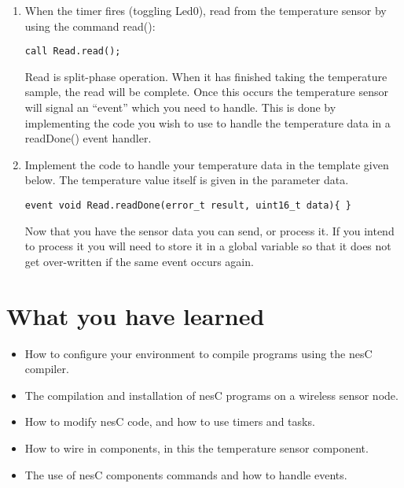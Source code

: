 \documentclass [a4] {article}
\begin{document}
\begin{enumerate}

\item When the timer fires (toggling Led0), read from the temperature sensor by using the command read():

\begin{verbatim}
call Read.read();
\end{verbatim}

Read is split-phase operation. When it has finished taking the temperature sample, the read will be complete. Once this occurs the temperature sensor will signal an ``event'' which you need to handle. This is done by implementing the code you wish to use to handle the temperature data in a readDone() event handler.

\item Implement the code to handle your temperature data in the template given below. The temperature value itself is given in the parameter data.

\begin{verbatim}
event void Read.readDone(error_t result, uint16_t data){ }
\end{verbatim}

Now that you have the sensor data you can send, or process it. If you intend to process it you will need to store it in a global variable so that it does not get over-written if the same event occurs again.

\end{enumerate}

\section{What you have learned}

\begin{itemize}

\item How to configure your environment to compile programs using the nesC compiler.
\item The compilation and installation of nesC programs on a wireless sensor node.
\item How to modify nesC code, and how to use timers and tasks.
\item How to wire in components, in this the temperature sensor component.
\item The use of nesC components commands and how to handle events.

\end{itemize}
\end{document}
